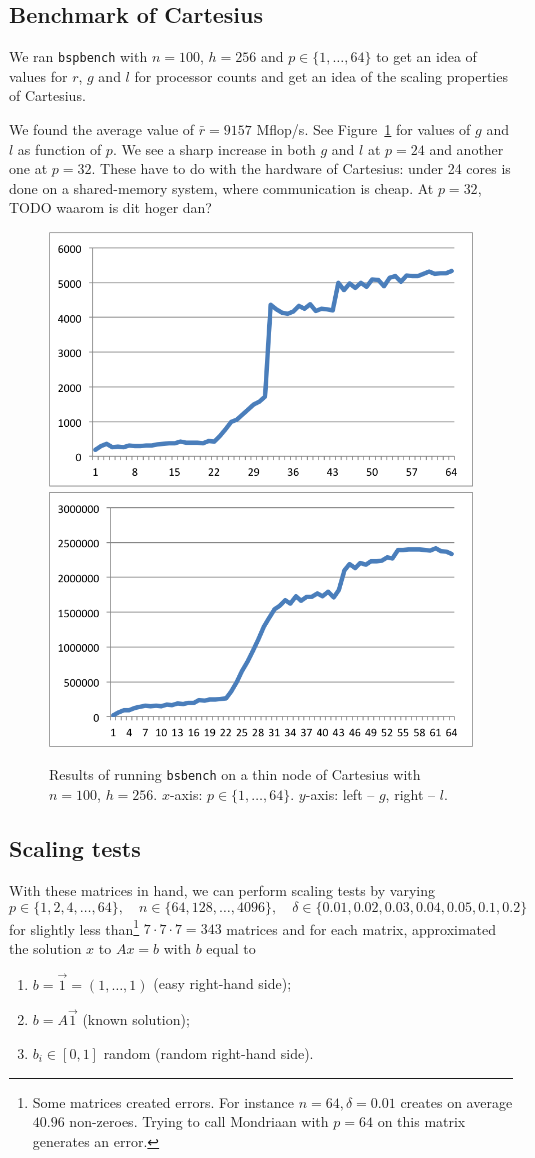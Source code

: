 \documentclass[11pt]{amsart}
\theoremstyle{definition}
\begin{document}
\subsection{Benchmark of Cartesius}
\label{sec:cart}
We ran \texttt{bspbench} with $n=100$, $h=256$ and $p \in \{1, \ldots, 64\}$ to get an idea of values for $r$, $g$ and $l$ for processor counts and get an idea of the scaling properties of Cartesius.

We found the average value of $\bar r = 9157$ Mflop/s. See Figure~\ref{fig:cart} for values of $g$ and $l$ as function of $p$. We see a sharp increase in both $g$ and $l$ at $p=24$ and another one at $p=32$. These have to do with the hardware of Cartesius: under 24 cores is done on a shared-memory system, where communication is cheap. At $p=32$, TODO waarom is dit hoger dan?

\begin{figure}
  \includegraphics[width=0.49\linewidth]{cartg.png}
  \includegraphics[width=0.49\linewidth]{cartl.png}
  \caption{Results of running \texttt{bsbench} on a thin node of Cartesius with $n=100$, $h=256$. $x$-axis: $p \in \{1, \ldots, 64\}$. $y$-axis: left -- $g$, right -- $l$.}
  \label{fig:cart}
\end{figure}

\subsection{Scaling tests}
With these matrices in hand, we can perform scaling tests by varying 
\[ p \in \{1, 2, 4, \ldots, 64\}, \quad n \in \{64, 128, \ldots, 4096 \}, \quad \delta \in \{0.01, 0.02, 0.03, 0.04, 0.05, 0.1, 0.2\} \]
for slightly less than\footnote{Some matrices created errors. For instance $n = 64, \delta = 0.01$ creates on average $40.96$ non-zeroes. Trying to call Mondriaan with $p=64$ on this matrix generates an error.} $7 \cdot 7 \cdot 7 = 343$ matrices and for each matrix, approximated the solution $x$ to $Ax=b$ with $b$ equal to
\begin{enumerate}
  \item $b = \vec 1 = (1, \ldots, 1)$ (easy right-hand side);
  \item $b = A\vec 1$ (known solution);
  \item $b_i \in [0, 1]$ random (random right-hand side).
\end{enumerate}
\end{document}
